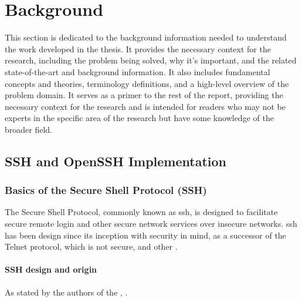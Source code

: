 \chapter{Background}\label{sec:background}

% 
%

This section is dedicated to the background information needed to understand the work developed in the thesis. It provides the necessary context for the research, including the problem being solved, why it's important, and the related state-of-the-art and background information. It also includes fundamental concepts and theories, terminology definitions, and a high-level overview of the problem domain. It serves as a primer to the rest of the report, providing the necessary context for the research and is intended for readers who may not be experts in the specific area of the research but have some knowledge of the broader field.

\section{SSH and OpenSSH Implementation}\label{sec:background:ssh}

    \subsection{Basics of the Secure Shell Protocol (SSH)}
    
    The Secure Shell Protocol, commonly known as \acrshort{ssh}, is designed to facilitate secure remote login and other secure network services over insecure networks. \acrshort{ssh} has been design since its inception with security in mind, as a successor of the Telnet protocol, which is not secure, and other  \cite{SSHkex22}. 
    
    \subsubsection{SSH design and origin}
    As stated by the authors of the ,  \cite{SSHReport18}.


